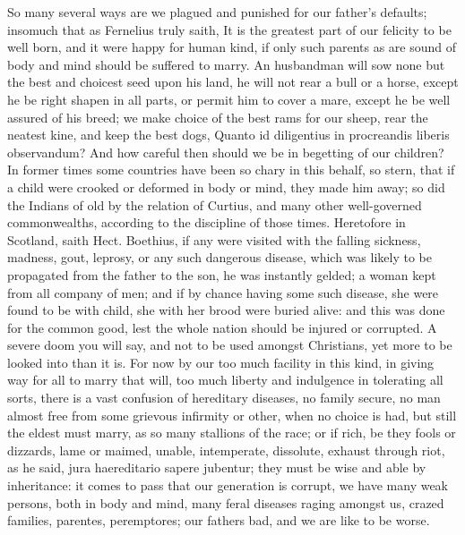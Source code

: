 {{So many several ways are we plagued and punished for our father's
defaults; insomuch that as Fernelius truly saith, It is the
greatest part of our felicity to be well born, and it were happy for
human kind, if only such parents as are sound of body and mind should
be suffered to marry. An husbandman will sow none but the best and
choicest seed upon his land, he will not rear a bull or a horse, except
he be right shapen in all parts, or permit him to cover a mare, except
he be well assured of his breed; we make choice of the best rams for
our sheep, rear the neatest kine, and keep the best dogs, Quanto id
diligentius in procreandis liberis observandum? And how careful then
should we be in begetting of our children? In former times some
countries have been so chary in this behalf, so stern, that if a
child were crooked or deformed in body or mind, they made him away; so
did the Indians of old by the relation of Curtius, and many other
well-governed commonwealths, according to the discipline of those
times. Heretofore in Scotland, saith Hect. Boethius, if any were
visited with the falling sickness, madness, gout, leprosy, or any such
dangerous disease, which was likely to be propagated from the father to
the son, he was instantly gelded; a woman kept from all company of men;
and if by chance having some such disease, she were found to be with
child, she with her brood were buried alive: and this was done for the
common good, lest the whole nation should be injured or corrupted. A
severe doom you will say, and not to be used amongst Christians, yet
more to be looked into than it is. For now by our too much facility in
this kind, in giving way for all to marry that will, too much liberty
and indulgence in tolerating all sorts, there is a vast confusion of
hereditary diseases, no family secure, no man almost free from some
grievous infirmity or other, when no choice is had, but still the
eldest must marry, as so many stallions of the race; or if rich, be
they fools or dizzards, lame or maimed, unable, intemperate, dissolute,
exhaust through riot, as he said, jura haereditario sapere
jubentur; they must be wise and able by inheritance: it comes to pass
that our generation is corrupt, we have many weak persons, both in body
and mind, many feral diseases raging amongst us, crazed families,
parentes, peremptores; our fathers bad, and we are like to be worse.


}}
